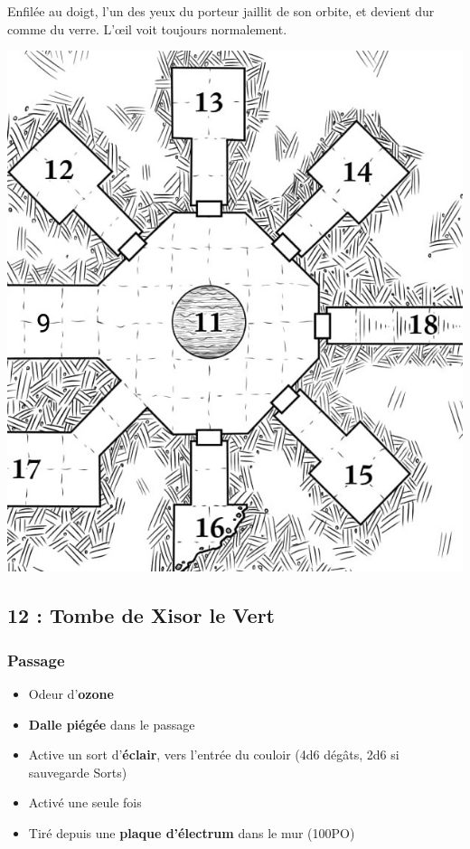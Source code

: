 \begin{highlight}
Enfilée au doigt, l’un des yeux du porteur jaillit de son orbite, et devient dur comme du verre.
L’\oe il voit toujours normalement.
\end{highlight}

\vfill
\pagebreak

\includegraphics[width=\linewidth]{pics/map_11-18.jpg}
\subsection{12 : Tombe de Xisor le Vert}\label{n2:s12}
\subsubsection{Passage}
\begin{itemize}
    \item Odeur d'\textbf{ozone}
    \item \textbf{Dalle piégée} dans le passage
    \item Active un sort d’\textbf{éclair}, vers l’entrée du couloir (4d6 dégâts, 2d6 si sauvegarde Sorts)
    \item Activé une seule fois
    \item Tiré depuis une \textbf{plaque d’électrum} dans le mur (100PO)
\end{itemize}
